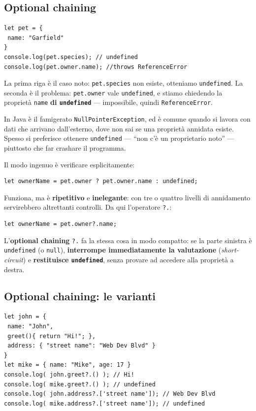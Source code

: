 \documentclass[10pt,a4paper]{article}
\begin{document}
\subsection{Optional chaining}

\begin{lstlisting}[style=js]
let pet = {
 name: "Garfield"
}
console.log(pet.species); // undefined
console.log(pet.owner.name); //throws ReferenceError
\end{lstlisting}

La prima riga è il caso noto: \texttt{pet.species} non esiste, otteniamo \texttt{undefined}. La seconda è il problema: \texttt{pet.owner} vale \texttt{undefined}, e stiamo chiedendo la proprietà \texttt{name} \textbf{di \texttt{undefined}} --- impossibile, quindi \texttt{ReferenceError}.

In Java è il famigerato \texttt{NullPointerException}, ed è comune quando si lavora con dati che arrivano dall'esterno, dove non sai se una proprietà annidata esiste. Spesso si preferisce ottenere \texttt{undefined} --- ``non c'è un proprietario noto'' --- piuttosto che far crashare il programma.

Il modo ingenuo è verificare esplicitamente:

\begin{lstlisting}[style=js]
let ownerName = pet.owner ? pet.owner.name : undefined;
\end{lstlisting}

Funziona, ma è \textbf{ripetitivo} e \textbf{inelegante}: con tre o quattro livelli di annidamento servirebbero altrettanti controlli. Da qui l'operatore \texttt{?.}:

\begin{lstlisting}[style=js]
let ownerName = pet.owner?.name;
\end{lstlisting}

L'\textbf{optional chaining} \texttt{?.} fa la stessa cosa in modo compatto: se la parte sinistra è \texttt{undefined} (o \texttt{null}), \textbf{interrompe immediatamente la valutazione} (\emph{short-circuit}) e \textbf{restituisce \texttt{undefined}}, senza provare ad accedere alla proprietà a destra.

\subsection{Optional chaining: le varianti}

\begin{lstlisting}[style=js]
let john = {
 name: "John",
 greet(){ return "Hi!"; },
 address: { "street name": "Web Dev Blvd" }
}
let mike = { name: "Mike", age: 17 }
console.log( john.greet?.() ); // Hi!
console.log( mike.greet?.() ); // undefined
console.log( john.address?.['street name']); // Web Dev Blvd
console.log( mike.address?.['street name']); // undefined
\end{lstlisting}
\end{document}
